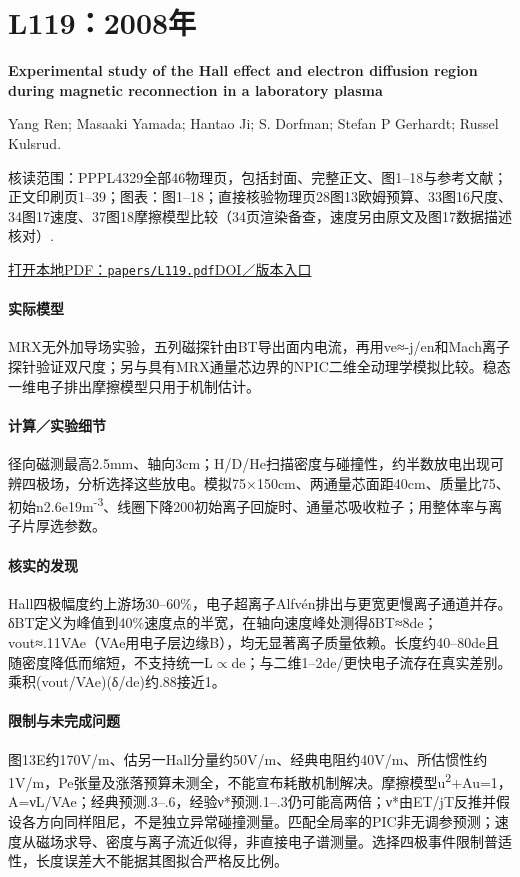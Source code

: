 \section{L119：2008年}\label{paper:L119}

\textbf{Experimental study of the Hall effect and electron diffusion region during magnetic reconnection in a laboratory plasma}\citep{L119}\

Yang Ren;  Masaaki Yamada;  Hantao Ji;  S. Dorfman;  Stefan P Gerhardt;  Russel Kulsrud.

\textsf{核读范围：}PPPL4329全部46物理页，包括封面、完整正文、图1–18与参考文献；正文印刷页1–39；\textsf{图表：}图1–18；直接核验物理页28图13欧姆预算、33图16尺度、34图17速度、37图18摩擦模型比较（34页渲染备查，速度另由原文及图17数据描述核对）.

\href{run:papers/L119.pdf}{打开本地PDF：\texttt{papers/L119.pdf}}\quad\href{https://doi.org/10.1063/1.2936269}{DOI／版本入口}

\paragraph{实际模型}MRX无外加导场实验，五列磁探针由BT导出面内电流，再用ve≈-j/en和Mach离子探针验证双尺度；另与具有MRX通量芯边界的NPIC二维全动理学模拟比较。稳态一维电子排出摩擦模型只用于机制估计。

\paragraph{计算／实验细节}径向磁测最高2.5mm、轴向3cm；H/D/He扫描密度与碰撞性，约半数放电出现可辨四极场，分析选择这些放电。模拟75×150cm、两通量芯面距40cm、质量比75、初始n2.6e19m\textsuperscript{-3}、线圈下降200初始离子回旋时、通量芯吸收粒子；用整体率与离子片厚选参数。

\paragraph{核实的发现}Hall四极幅度约上游场30–60\%，电子超离子Alfvén排出与更宽更慢离子通道并存。δBT定义为峰值到40\%速度点的半宽，在轴向速度峰处测得δBT≈8de；vout≈.11VAe（VAe用电子层边缘B），均无显著离子质量依赖。长度约40–80de且随密度降低而缩短，不支持统一L\ensuremath{\propto}de；与二维1–2de/更快电子流存在真实差别。乘积(vout/VAe)(δ/de)约.88接近1。

\paragraph{限制与未完成问题}图13E约170V/m、估另一Hall分量约50V/m、经典电阻约40V/m、所估惯性约1V/m，Pe张量及涨落预算未测全，不能宣布耗散机制解决。摩擦模型u\textsuperscript{2}+Au=1，A=νL/VAe；经典预测.3–.6，经验ν*预测.1–.3仍可能高两倍；ν*由ET/jT反推并假设各方向同样阻尼，不是独立异常碰撞测量。匹配全局率的PIC非无调参预测；速度从磁场求导、密度与离子流近似得，非直接电子谱测量。选择四极事件限制普适性，长度误差大不能据其图拟合严格反比例。

